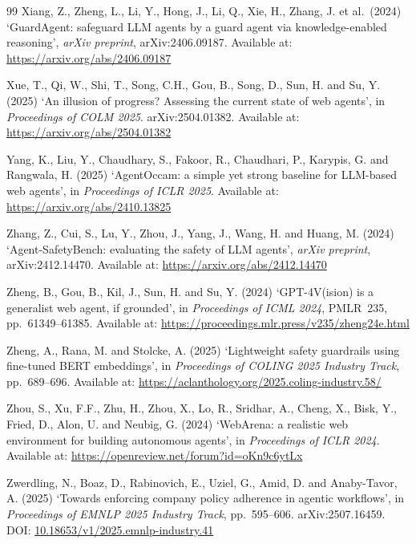 \documentclass[12pt,a4paper]{article}
\begin{document}
\begin{thebibliography}{99}
Xiang, Z., Zheng, L., Li, Y., Hong, J., Li, Q., Xie, H., Zhang, J. et al.\ (2024)
`GuardAgent: safeguard LLM agents by a guard agent via knowledge-enabled reasoning',
\textit{arXiv preprint}, arXiv:2406.09187.
Available at: \url{https://arxiv.org/abs/2406.09187}

Xue, T., Qi, W., Shi, T., Song, C.H., Gou, B., Song, D., Sun, H. and Su, Y. (2025)
`An illusion of progress? Assessing the current state of web agents',
in \textit{Proceedings of COLM 2025}. arXiv:2504.01382.
Available at: \url{https://arxiv.org/abs/2504.01382}

Yang, K., Liu, Y., Chaudhary, S., Fakoor, R., Chaudhari, P., Karypis, G.
and Rangwala, H. (2025)
`AgentOccam: a simple yet strong baseline for LLM-based web agents',
in \textit{Proceedings of ICLR 2025}.
Available at: \url{https://arxiv.org/abs/2410.13825}

Zhang, Z., Cui, S., Lu, Y., Zhou, J., Yang, J., Wang, H. and Huang, M. (2024)
`Agent-SafetyBench: evaluating the safety of LLM agents',
\textit{arXiv preprint}, arXiv:2412.14470.
Available at: \url{https://arxiv.org/abs/2412.14470}

Zheng, B., Gou, B., Kil, J., Sun, H. and Su, Y. (2024)
`GPT-4V(ision) is a generalist web agent, if grounded',
in \textit{Proceedings of ICML 2024}, PMLR~235, pp.~61349--61385.
Available at: \url{https://proceedings.mlr.press/v235/zheng24e.html}

Zheng, A., Rana, M. and Stolcke, A. (2025)
`Lightweight safety guardrails using fine-tuned BERT embeddings',
in \textit{Proceedings of COLING 2025 Industry Track}, pp.~689--696.
Available at: \url{https://aclanthology.org/2025.coling-industry.58/}

Zhou, S., Xu, F.F., Zhu, H., Zhou, X., Lo, R., Sridhar, A., Cheng, X.,
Bisk, Y., Fried, D., Alon, U. and Neubig, G. (2024)
`WebArena: a realistic web environment for building autonomous agents',
in \textit{Proceedings of ICLR 2024}.
Available at: \url{https://openreview.net/forum?id=oKn9c6ytLx}

Zwerdling, N., Boaz, D., Rabinovich, E., Uziel, G., Amid, D. and
Anaby-Tavor, A. (2025)
`Towards enforcing company policy adherence in agentic workflows',
in \textit{Proceedings of EMNLP 2025 Industry Track}, pp.~595--606.
arXiv:2507.16459.
DOI: \href{https://doi.org/10.18653/v1/2025.emnlp-industry.41}{10.18653/v1/2025.emnlp-industry.41}

\end{thebibliography}
\end{document}
